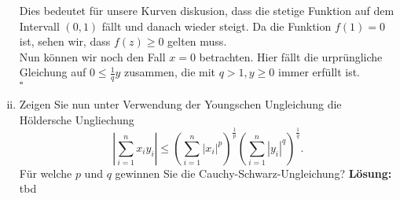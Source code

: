 \documentclass[11pt,a4paper,ngerman]{article}
\begin{document}
\begin{enumerate}[(i)]
        Dies bedeutet für unsere Kurven diskusion, dass die stetige Funktion auf dem Intervall $(0,1)$ fällt
        und danach wieder steigt. Da die Funktion $f(1) = 0$ ist, sehen wir, dass $f(z) \geq 0$ gelten muss.\\

        Nun können wir noch den Fall $x=0$ betrachten. Hier fällt die urprüngliche Gleichung auf
        $0 \leq \frac{1}{q} y$ zusammen, die mit $q>1, y\geq 0$ immer erfüllt ist.\\

        \mbox{} \hfill $\square$

	\item Zeigen Sie nun unter Verwendung der Youngschen Ungleichung die Höldersche Ungliechung
		$$
			\left| \overset{n}{\underset{i=1}{\sum}} x_i y_i \right| \leq \left( \overset{n}{\underset{i=1}{\sum}} |x_i|^p \right)^{\frac{1}{p}}
				\left( \overset{n}{\underset{i=1}{\sum}} | y_i |^q \right) ^{\frac{1}{q}}.
		$$
		Für welche $p$ und $q$ gewinnen Sie die Cauchy-Schwarz-Ungleichung?
	\textbf{Lösung:}\\
		tbd
\end{enumerate}
\end{document}
